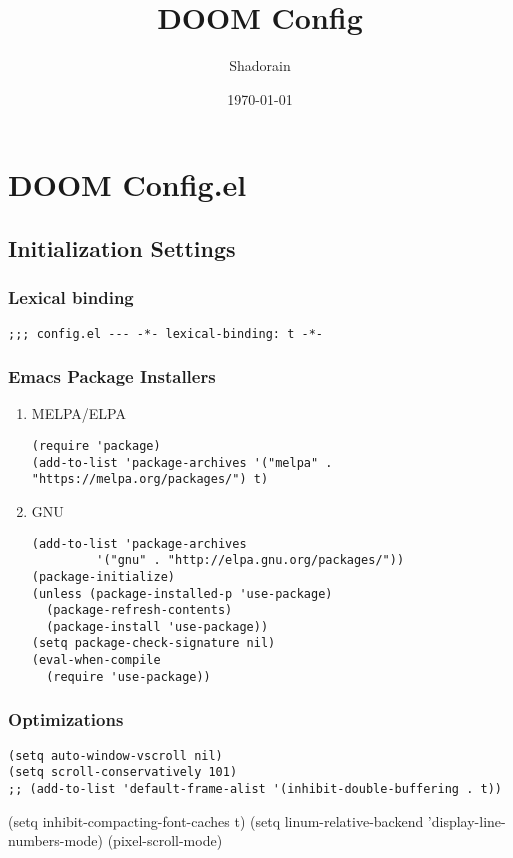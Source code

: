 \documentclass[11pt]{article}
\author{Shadorain}
\date{\today}
\title{DOOM Config}
\begin{document}
\maketitle
\tableofcontents


\section{DOOM Config.el}
\label{sec:org77904ff}
\subsection{Initialization Settings}
\label{sec:org5f7b2c0}
\subsubsection{Lexical binding}
\label{sec:org344496d}
\begin{verbatim}
;;; config.el --- -*- lexical-binding: t -*-
\end{verbatim}
\subsubsection{Emacs Package Installers}
\label{sec:orgca71cdd}
\begin{enumerate}
\item MELPA/ELPA
\label{sec:orgf917cbf}
\begin{verbatim}
(require 'package)
(add-to-list 'package-archives '("melpa" . "https://melpa.org/packages/") t)
\end{verbatim}
\item GNU
\label{sec:orgf8eccf8}
\begin{verbatim}
(add-to-list 'package-archives
         '("gnu" . "http://elpa.gnu.org/packages/"))
(package-initialize)
(unless (package-installed-p 'use-package)
  (package-refresh-contents)
  (package-install 'use-package))
(setq package-check-signature nil)
(eval-when-compile
  (require 'use-package))
\end{verbatim}
\end{enumerate}
\subsubsection{Optimizations}
\label{sec:orgc37e15d}
\begin{verbatim}
(setq auto-window-vscroll nil)
(setq scroll-conservatively 101)
;; (add-to-list 'default-frame-alist '(inhibit-double-buffering . t))
\end{verbatim}
(setq inhibit-compacting-font-caches t)
(setq linum-relative-backend 'display-line-numbers-mode)
(pixel-scroll-mode)
\end{document}

